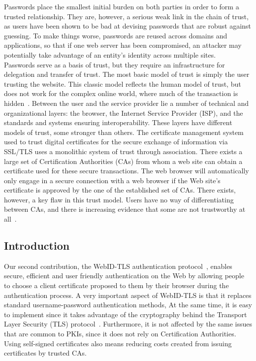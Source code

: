 Passwords place the smallest initial burden on both parties in order to form a trusted relationship. They are, however, a serious weak link in the chain of trust, as users have been shown to be bad at devising passwords that are robust against guessing. To make things worse, passwords are reused across domains and applications, so that if one web server has been compromised, an attacker may potentially take advantage of an entity's identity across multiple sites.\\

Passwords serve as a basis of trust, but they require an infrastructure for delegation and transfer of trust. The most basic model of trust is simply the user trusting the website. This classic model reflects the human model of trust, but does not work for the complex online world, where much of the transaction is hidden~\cite{camp2007reliable}. Between the user and the service provider lie a number of technical and organizational layers: the browser, the Internet Service Provider (ISP), and the standards and systems ensuring interoperability. These layers have different models of trust, some stronger than others. The certificate management system used to trust digital certificates for the secure exchange of information via SSL/TLS uses a monolithic system of trust through association. There exists a large set of Certification Authorities (CAs) from whom a web site can obtain a certificate used for these secure transactions. The web browser will automatically only engage in a secure connection with a web browser if the Web site's certificate is approved by the one of the established set of CAs. There exists, however, a key flaw in this trust model. Users have no way of differentiating between CAs, and there is increasing evidence that some are not trustworthy at all~\cite{arnbak2012certificate}.\\

\subsection{Introduction}
\label{subsec:webid-tls_idea}
Our second contribution, the WebID-TLS authentication protocol~\cite{webid-tls}, enables secure, efficient and user friendly authentication on the Web by allowing people to choose a client certificate proposed to them by their browser during the authentication process. A very important aspect of WebID-TLS is that it replaces standard username-password authentication methods, At the same time, it is easy to implement since it takes advantage of the cryptography behind the Transport Layer Security (TLS) protocol~\cite{dierks2008transport}. Furthermore, it is not affected by the same issues that are common to PKIs, since it does not rely on Certification Authorities. Using self-signed certificates also means reducing costs created from issuing certificates by trusted CAs.\\

